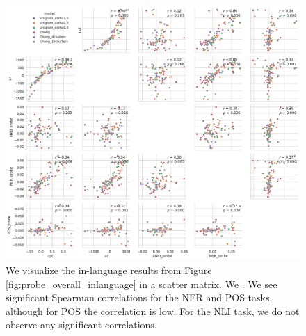 \begin{figure}[H]
    \centering
    \includegraphics[width=\textwidth]{figures/probe_detailed_inlanguage_scattermatrix.pdf}
    \caption{We visualize the in-language results from Figure \ref{fig:probe_overall_inlanguage} in a scatter matrix. We . We see significant Spearman correlations for the NER and POS tasks, although for POS the correlation is low. For the NLI task, we do not observe any significant correlations.}
    \label{fig:probe_overall_inlanguage_scattermatrix}
\end{figure}

